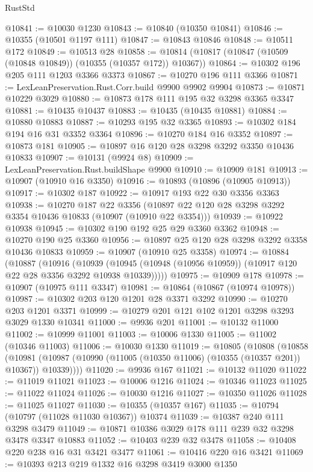 \begin{lexlean}{RustStd}
\begin{coremodule}
@10841 := @10030 @1230
@10843 := @10840 (@10350 @10841)
@10846 := @10355 (@10501 @1197 @111)
@10847 := @10843 @10846
@10848 := @10511 @172
@10849 := @10513 @28
@10858 := @10814 (@10817 (@10847 (@10509 (@10848 @10849)) (@10355 (@10357 @172)) @10367))
@10864 := @10302 @196 @205 @111 @1203 @3366 @3373
@10867 := @10270 @196 @111 @3366
@10871 := LexLeanPreservation.Rust.Corr.build @9900 @9902 @9904
@10873 := @10871 @10229 @3029
@10880 := @10873 @178 @111 @195 @32 @3298 @3365 @3347
@10881 := @10435 @10437
@10883 := @10435 (@10435 @10881)
@10884 := @10880 @10883
@10887 := @10293 @195 @32 @3365
@10893 := @10302 @184 @194 @16 @31 @3352 @3364
@10896 := @10270 @184 @16 @3352
@10897 := @10873 @181
@10905 := @10897 @16 @120 @28 @3298 @3292 @3350 @10436 @10833
@10907 := @10131 (@9924 @8)
@10909 := LexLeanPreservation.Rust.buildShape @9900
@10910 := @10909 @181
@10913 := @10907 (@10910 @16 @3350)
@10916 := @10893 (@10896 (@10905 @10913))
@10917 := @10302 @187
@10922 := @10917 @193 @22 @30 @3356 @3363
@10938 := @10270
    @187
    @22
    @3356
    (@10897 @22 @120 @28 @3298 @3292 @3354 @10436 @10833 (@10907 (@10910 @22 @3354)))
@10939 := @10922 @10938
@10945 := @10302 @190 @192 @25 @29 @3360 @3362
@10948 := @10270 @190 @25 @3360
@10956 := @10897 @25 @120 @28 @3298 @3292 @3358 @10436 @10833
@10959 := @10907 (@10910 @25 @3358)
@10974 := @10884
    (@10887
      (@10916
        (@10939 (@10945 (@10948 (@10956 @10959)) (@10917 @120 @22 @28 @3356 @3292 @10938 @10339)))))
@10975 := @10909 @178
@10978 := @10907 (@10975 @111 @3347)
@10981 := @10864 (@10867 (@10974 @10978))
@10987 := @10302 @203 @120 @1201 @28 @3371 @3292
@10990 := @10270 @203 @1201 @3371
@10999 := @10279 @201 @121 @102 @1201 @3298 @3293 @3029 @1330 @10341
@11000 := @9936 @201
@11001 := @10132 @11000
@11002 := @10999 @11001
@11003 := @10006 @1330
@11005 := @11002 (@10346 @11003)
@11006 := @10030 @1330
@11019 := @10805
    (@10808
      (@10858
        (@10981 (@10987 (@10990 (@11005 (@10350 @11006) (@10355 (@10357 @201)) @10367)) @10339))))
@11020 := @9936 @167
@11021 := @10132 @11020
@11022 := @11019 @11021
@11023 := @10006 @1216
@11024 := @10346 @11023
@11025 := @11022 @11024
@11026 := @10030 @1216
@11027 := @10350 @11026
@11028 := @11025 @11027
@11030 := @10355 (@10357 @167)
@11035 := @10794 (@10797 (@11028 @11030 @10367)) @10374
@11039 := @10387 @240 @111 @3298 @3479
@11049 := @10871 @10386 @3029 @178 @111 @239 @32 @3298 @3478 @3347 @10883
@11052 := @10403 @239 @32 @3478
@11058 := @10408 @220 @238 @16 @31 @3421 @3477
@11061 := @10416 @220 @16 @3421
@11069 := @10393 @213 @219 @1332 @16 @3298 @3419 @3000 @1350

\end{coremodule}
\end{lexlean}
